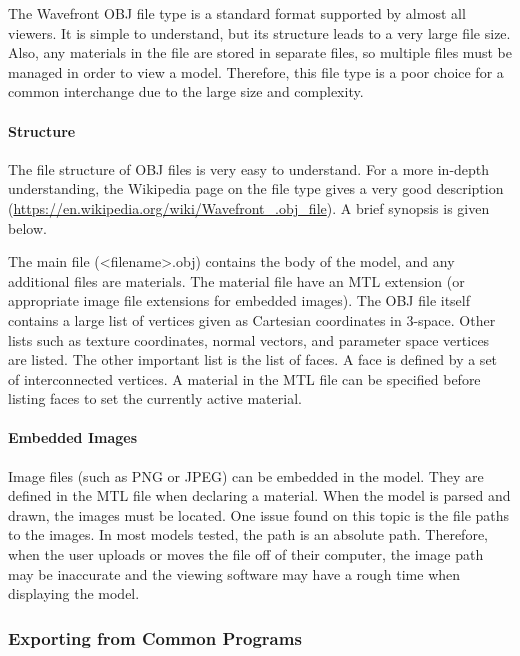             The Wavefront OBJ file type is a standard format supported by almost all viewers.  It is simple to understand, but its structure leads to a very large file size.  Also, any materials in the file are stored in separate files, so multiple files must be managed in order to view a model.  Therefore, this file type is a poor choice for a common interchange due to the large size and complexity.

            \paragraph{Structure}

                The file structure of OBJ files is very easy to understand.  For a more in-depth understanding, the Wikipedia page on the file type gives a very good description (\url{https://en.wikipedia.org/wiki/Wavefront_.obj_file}).  A brief synopsis is given below.

                The main file (<filename>.obj) contains the body of the model, and any additional files are materials.  The material file have an MTL extension (or appropriate image file extensions for embedded images).  The OBJ file itself contains a large list of vertices given as Cartesian coordinates in 3-space.  Other lists such as texture coordinates, normal vectors, and parameter space vertices are listed.  The other important list is the list of faces.  A face is defined by a set of interconnected vertices.  A material in the MTL file can be specified before listing faces to set the currently active material.

            \paragraph{Embedded Images}

                Image files (such as PNG or JPEG) can be embedded in the model.  They are defined in the MTL file when declaring a material.  When the model is parsed and drawn, the images must be located.  One issue found on this topic is the file paths to the images.  In most models tested, the path is an absolute path.  Therefore, when the user uploads or moves the file off of their computer, the image path may be inaccurate and the viewing software may have a rough time when displaying the model.

        \subsubsection{Exporting from Common Programs}

